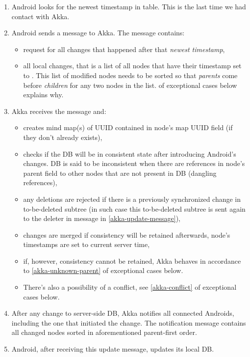 \begin{enumerate}
	\item Android looks for the newest timestamp in  table. This is the last time we had contact with Akka.

	\item Android sends a message to Akka. The message contains:
	\begin{itemize}
		\item request for all changes that happened after that \emph{newest timestamp},
		\item all local changes, that is a list of all nodes that have their timestamp set to . This list of modified nodes needs to be sorted so that \emph{parents} come before \emph{children} for any two nodes in the list.  of exceptional cases below explains why.
	\end{itemize}

	\item Akka receives the message and:
	\begin{itemize}
		\item creates mind map(s) of UUID contained in node's map UUID field (if they don't already exists),
		\item checks if the DB will be in consistent state after introducing Android's changes. DB is said to be inconsistent when there are references in node's parent field to other nodes that are not present in DB (dangling references),
		\item any deletions are rejected if there is a previously synchronized change in to-be-deleted subtree (in such case this to-be-deleted subtree is sent again to the deleter in message in \cref{akka-update-message}),
		\item changes are merged if consistency will be retained afterwards, node's timestamps are set to current server time,
		\item if, however, consistency cannot be retained, Akka behaves in accordance to \cref{akka-unknown-parent} of exceptional cases below.
		\item There's also a possibility of a conflict, see \cref{akka-conflict} of exceptional cases below.
	\end{itemize}

	\item \label{akka-update-message} After any change to server-side DB, Akka notifies all connected Androids, including the one that initiated the change. The notification message contains all changed nodes sorted in aforementioned parent-first order.

	\item Android, after receiving this update message, updates its local DB.
\end{enumerate}

